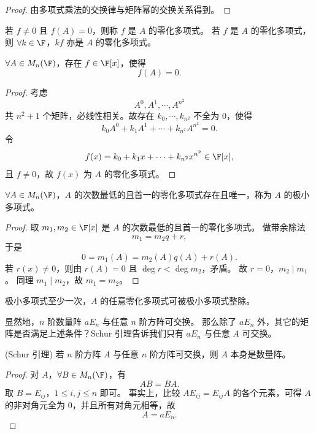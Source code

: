 \begin{proof}
	由多项式乘法的交换律与矩阵幂的交换关系得到。
\end{proof}

\begin{definition}\label{p1:concept:c3-l757}
	若 $f\neq0$ 且 $f(A)=0$，则称 $f$ 是 $A$ 的零化多项式。
	若 $f$ 是 $A$ 的零化多项式，则 $\forall k\in\F$，$kf$ 亦是 $A$ 的零化多项式。
\end{definition}

\begin{proposition}
	$\forall A\in M_n(\F)$，存在 $f\in\F[x]$，使得
	\[
	f(A)=0.
	\]
\end{proposition}

\begin{proof}
	考虑
	\[
	A^0,A^1,\cdots,A^{n^2}
	\]
	共 $n^2+1$ 个矩阵，必线性相关。故存在
	$k_0,\cdots,k_{n^2}$ 不全为 $0$，使得
	\[
	k_0A^0+k_1A^1+\cdots+k_{n^2}A^{n^2}=0.
	\]
	令
	\[
	f(x)=k_0+k_1x+\cdots+k_{n^2}x^{n^2}\in\F[x],
	\]
	且 $f\neq0$，故 $f(x)$ 为 $A$ 的零化多项式。
\end{proof}

\begin{proposition}
	\label{p1:concept:c3-l787}$\forall A\in M_n(\F)$，$A$ 的次数最低的且首一的零化多项式存在且唯一，称为 $A$ 的极小多项式。
\end{proposition}

\begin{proof}
	取 $m_1,m_2\in\F[x]$ 是 $A$ 的次数最低的且首一的零化多项式。
	做带余除法
	\[
	m_1=m_2q+r,
	\]
	于是
	\[
	0=m_1(A)=m_2(A)q(A)+r(A).
	\]
	若 $r(x)\neq0$，则由 $r(A)=0$ 且 $\deg r<\deg m_2$，矛盾。
	故 $r=0$，$m_2\mid m_1$。
	同理 $m_1\mid m_2$，故 $m_1=m_2$。
\end{proof}

极小多项式至少一次，$A$ 的任意零化多项式可被极小多项式整除。

显然地，$n$ 阶数量阵 $aE_n$ 与任意 $n$ 阶方阵可交换。
那么除了 $aE_n$ 外，其它的矩阵是否满足上述条件？Schur 引理告诉我们只有 $aE_n$ 与任意 $A$ 可交换。

\begin{lemma}(Schur 引理)
	若 $n$ 阶方阵 $A$ 与任意 $n$ 阶方阵可交换，则 $A$ 本身是数量阵。
\end{lemma}

\begin{proof}
	对 $A$，$\forall B\in M_n(\F)$，有
	\[
	AB=BA.
	\]
	取 $B=E_{ij}$，$1\leq i,j\leq n$ 即可。
	事实上，比较 $AE_{ij}=E_{ij}A$ 的各个元素，可得 $A$ 的非对角元全为 $0$，并且所有对角元相等，故
	\[
	A=aE_n.
	\]
\end{proof}


